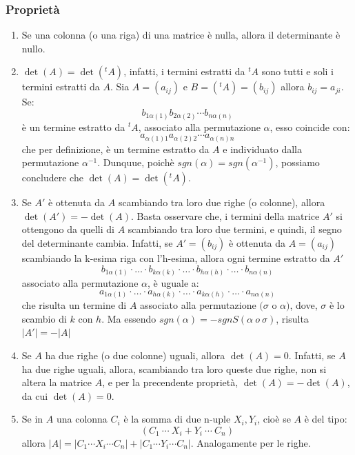 \documentclass{article}
\newcommand{\ah}{\alpha}
\begin{document}
\subsubsection{Proprietà}
\begin{enumerate}
    \item Se una colonna (o una riga) di una matrice è nulla, allora il determinante è nullo.
    \item $\det(A) = \det({^{t}A})$, infatti, i termini estratti da ${^{t}A}$ sono tutti e soli i termini estratti da $A$. Sia $A= (a_{ij})$ e $B = ({^{t}A}) = (b_{ij})$ allora $b_{ij} = a_{ji}$. Se:
          \[
              b_{1\ah(1)}b_{2\ah(2)}\cdots b_{n\ah(n)}
          \]
          è un termine estratto da ${^{t}A}$, associato alla permutazione $\ah$, esso coincide con:
          \[
              a_{\ah(1)1}a_{\ah(2)2}\cdots a_{\ah(n)n}
          \]
          che per definizione, è un termine estratto da $A$ e individuato dalla permutazione $\ah^{-1}$. Dunquue, poichè $sgn (\ah) = sgn (\ah^{-1})$, possiamo concludere che $\det(A) = \det({^{t}A})$.
    \item Se $A'$ è ottenuta da $A$ scambiando tra loro due righe (o colonne), allora $\det(A') = -\det(A)$. Basta osservare che, i termini della matrice $A'$ si ottengono da quelli di $A$ scambiando tra loro due termini, e quindi, il segno del determinante cambia.
          Infatti, se $A'=(b_{ij})$ è ottenuta da $A= (a_{ij})$ scambiando la k-esima riga con l'h-esima, allora ogni termine estratto da $A'$
          \[
              b_{1\ah(1)}\cdot\ldots\cdot b_{k\ah(k)}\cdot\ldots\cdot b_{h\ah(h)}\cdot\ldots\cdot b_{n\ah(n)}
          \]
          associato alla permutazione $\ah$, è uguale a:
          \[
              a_{1\ah(1)}\cdot\ldots\cdot a_{h\ah(k)}\cdot\ldots\cdot a_{k\ah(h)}\cdot\ldots\cdot a_{n\ah(n)}
          \]
          che risulta un termine di $A$ associato alla permutazione $(\sigma$ o $\ah)$, dove, $\sigma$ è lo scambio di $k$ con $h$. Ma essendo $sgn(\ah)=-sgn S (\ah\ o \ \sigma)$, risulta $|A'| = -|A|$
    \item Se $A$ ha due righe (o due colonne) uguali, allora $\det(A) = 0$. Infatti, se $A$ ha due righe uguali, allora, scambiando tra loro queste due righe, non si altera la matrice $A$, e per la precendente proprietà, $\det(A) = -\det(A)$, da cui $\det(A) = 0$.
    \item Se in $A$ una colonna $C_i$ è la somma di due n-uple $X_i, Y_i$, cioè se $A$ è del tipo:
          \[
              (C_1\ \cdots\ X_i + Y_i\ \cdots\ C_n)
          \]
          allora $|A|=|C_1 \cdots X_i \cdots C_n|+|C_1\cdots Y_i\cdots C_n|$. Analogamente per le righe.

\end{enumerate}
\end{document}

